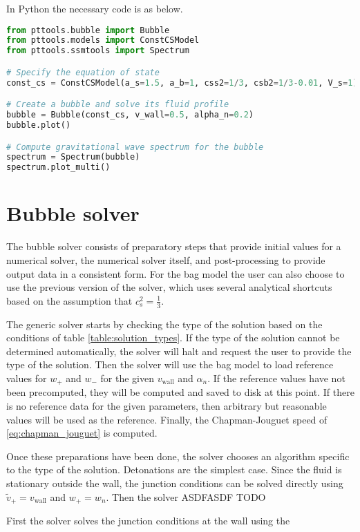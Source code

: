 \clearpage
In Python the necessary code is as below.
\begin{lstlisting}[language=Python]
from pttools.bubble import Bubble
from pttools.models import ConstCSModel
from pttools.ssmtools import Spectrum

# Specify the equation of state
const_cs = ConstCSModel(a_s=1.5, a_b=1, css2=1/3, csb2=1/3-0.01, V_s=1)

# Create a bubble and solve its fluid profile
bubble = Bubble(const_cs, v_wall=0.5, alpha_n=0.2)
bubble.plot()

# Compute gravitational wave spectrum for the bubble
spectrum = Spectrum(bubble)
spectrum.plot_multi()    
\end{lstlisting}


\section{Bubble solver}
The bubble solver consists of preparatory steps that provide initial values for a numerical solver, the numerical solver itself, and post-processing to provide output data in a consistent form.
For the bag model the user can also choose to use the previous version of the solver,
which uses several analytical shortcuts based on the assumption that $c_s^2 = \frac{1}{3}$.

The generic solver starts by checking the type of the solution based on the conditions of table \ref{table:solution_types}.
If the type of the solution cannot be determined automatically, the solver will halt and request the user to provide the type of the solution.
Then the solver will use the bag model to load reference values for $w_+$ and $w_-$ for the given $v_\text{wall}$ and $\alpha_n$.
If the reference values have not been precomputed, they will be computed and saved to disk at this point.
If there is no reference data for the given parameters, then arbitrary but reasonable values will be used as the reference.
Finally, the Chapman-Jouguet speed of \eqref{eq:chapman_jouguet} is computed.

Once these preparations have been done,
the solver chooses an algorithm specific to the type of the solution.
Detonations are the simplest case.
Since the fluid is stationary outside the wall,
the junction conditions can be solved directly using
$\tilde{v}_+ = v_\text{wall}$ and $w_+ = w_n$.
Then the solver
ASDFASDF TODO

First the solver solves the junction conditions at the wall using the 



